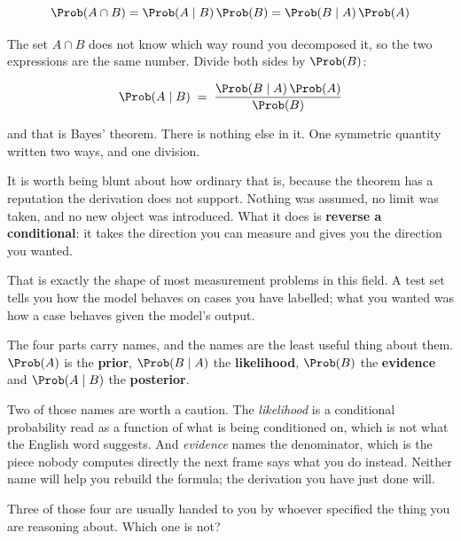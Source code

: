 \begin{fr}
\begin{ansblock}
\[ \Prob(A \cap B) = \Prob(A \mid B)\,\Prob(B)
   = \Prob(B \mid A)\,\Prob(A) \]
\end{ansblock}

The set $A \cap B$ does not know which way round you decomposed it, so the two
expressions are the same number. Divide both sides by $\Prob(B)$:

\[ \Prob(A \mid B) \;=\; \frac{\Prob(B \mid A)\,\Prob(A)}{\Prob(B)} \]

and that is Bayes' theorem. There is nothing else in it. One symmetric quantity
written two ways, and one division.
\end{fr}

\begin{fr}
It is worth being blunt about how ordinary that is, because the theorem has a
reputation the derivation does not support. Nothing was assumed, no limit was
taken, and no new object was introduced. What it does is \textbf{reverse a
conditional}: it takes the direction you can measure and gives you the
direction you wanted.

That is exactly the shape of most measurement problems in this field. A test
set tells you how the model behaves on cases you have labelled; what you wanted
was how a case behaves given the model's output.
\end{fr}

\begin{fr}
The four parts carry names, and the names are the least useful thing about
them. $\Prob(A)$ is the \textbf{prior}, $\Prob(B \mid A)$ the
\textbf{likelihood}, $\Prob(B)$ the \textbf{evidence} and $\Prob(A \mid B)$ the
\textbf{posterior}.

\begin{note}
Two of those names are worth a caution. The \emph{likelihood} is a conditional
probability read as a function of what is being conditioned on, which is not
what the English word suggests. And \emph{evidence} names the denominator,
which is the piece nobody computes directly \dash{} the next frame says what
you do instead. Neither name will help you rebuild the formula; the derivation
you have just done will.
\end{note}

Three of those four are usually handed to you by whoever specified the thing
you are reasoning about. Which one is not?
\dotline
\nextframe
\end{fr}

